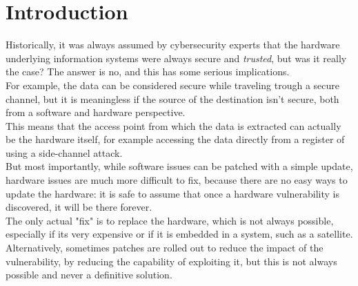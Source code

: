 \chapter{Introduction}
Historically, it was always assumed by cybersecurity experts that the hardware underlying information
systems were always secure and \textit{trusted}, but was it really the case? The answer is no, and 
this has some serious implications.\\ 
For example, the data can be considered secure while traveling trough a secure channel, but it is 
meaningless if the source of the destination isn't secure, both from a software and hardware perspective.\\
This means that the access point from which the data is extracted can actually be the hardware itself,
for example accessing the data directly from a register of using a side-channel attack.\\
But most importantly, while software issues can be patched with a simple update, hardware issues are
much more difficult to fix, because there are no easy ways to update the hardware: it is safe to 
assume that once a hardware vulnerability is discovered, it will be there forever.\\
The only actual "fix" is to replace the hardware, which is not always possible, especially if its 
very expensive or if it is embedded in a system, such as a satellite.\\
Alternatively, sometimes patches are rolled out to reduce the impact of the vulnerability, by reducing
the capability of exploiting it, but this is not always possible and never a definitive solution.\\

